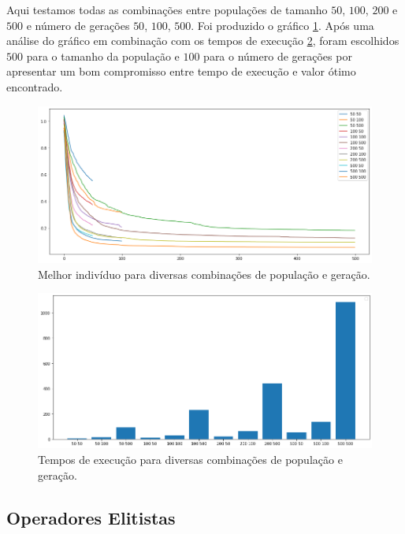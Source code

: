 \documentclass[10pt,twocolumn,letterpaper]{article}
\begin{document}
Aqui testamos todas as combinações entre populações de tamanho $50$, $100$, $200$ e $500$ e número de gerações $50$, $100$, $500$. Foi produzido o gráfico \ref{fig:popgen}. Após uma análise do gráfico em combinação com os tempos de execução \ref{fig:times}, foram escolhidos $500$ para o tamanho da população e $100$ para o número de gerações por apresentar um bom compromisso entre tempo de execução e valor ótimo encontrado.

\begin{figure}[H]
   \begin{center}
   \includegraphics[width=\linewidth]{popgen_best.png}
   \end{center}
      \caption{Melhor indivíduo para diversas combinações de população e geração.}
      \label{fig:popgen}
\end{figure}

\begin{figure}[H]
   \begin{center}
   \includegraphics[width=\linewidth]{times.png}
   \end{center}
      \caption{Tempos de execução para diversas combinações de população e geração.}
      \label{fig:times}
\end{figure}

\subsection{Operadores Elitistas}
\end{document}
